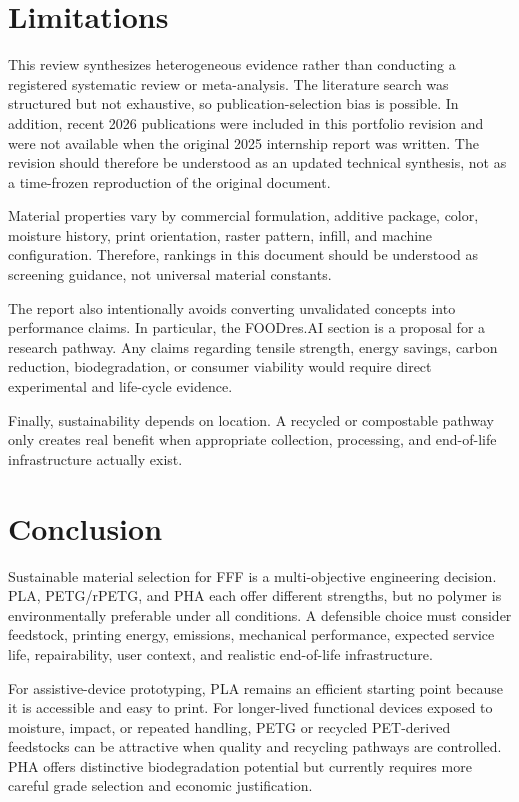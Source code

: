 \documentclass[11pt]{article}
\begin{document}
\section{Limitations}

This review synthesizes heterogeneous evidence rather than conducting a registered systematic review or meta-analysis. The literature search was structured but not exhaustive, so publication-selection bias is possible. In addition, recent 2026 publications were included in this portfolio revision and were not available when the original 2025 internship report was written. The revision should therefore be understood as an updated technical synthesis, not as a time-frozen reproduction of the original document.

 Material properties vary by commercial formulation, additive package, color, moisture history, print orientation, raster pattern, infill, and machine configuration. Therefore, rankings in this document should be understood as screening guidance, not universal material constants.

The report also intentionally avoids converting unvalidated concepts into performance claims. In particular, the FOODres.AI section is a proposal for a research pathway. Any claims regarding tensile strength, energy savings, carbon reduction, biodegradation, or consumer viability would require direct experimental and life-cycle evidence.

Finally, sustainability depends on location. A recycled or compostable pathway only creates real benefit when appropriate collection, processing, and end-of-life infrastructure actually exist.

\section{Conclusion}

Sustainable material selection for FFF is a multi-objective engineering decision. PLA, PETG/rPETG, and PHA each offer different strengths, but no polymer is environmentally preferable under all conditions. A defensible choice must consider feedstock, printing energy, emissions, mechanical performance, expected service life, repairability, user context, and realistic end-of-life infrastructure.

For assistive-device prototyping, PLA remains an efficient starting point because it is accessible and easy to print. For longer-lived functional devices exposed to moisture, impact, or repeated handling, PETG or recycled PET-derived feedstocks can be attractive when quality and recycling pathways are controlled. PHA offers distinctive biodegradation potential but currently requires more careful grade selection and economic justification.
\end{document}
